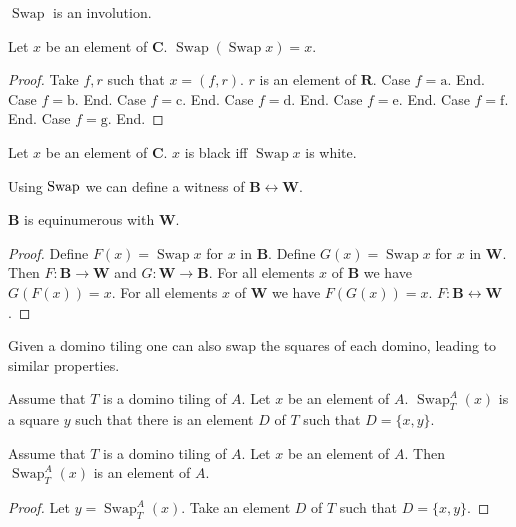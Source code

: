 \documentclass{article}
\newcommand{\Rank}{\mathbf{R}} %
\newcommand{\fileA}{\mathrm{a}}
\newcommand{\fileB}{\mathrm{b}}
\newcommand{\fileC}{\mathrm{c}}
\newcommand{\fileD}{\mathrm{d}}
\newcommand{\fileE}{\mathrm{e}}
\newcommand{\fileF}{\mathrm{f}}
\newcommand{\fileG}{\mathrm{g}}
\newcommand{\Checkerboard}{\mathbf{C}}
\newcommand{\Black}{\mathbf{B}}
\newcommand{\White}{\mathbf{W}}
\newcommand{\Swap}[1]{\operatorname{Swap}#1}
\newcommand{\Sw}[3]{\operatorname{Swap}_{#1}^{#2}(#3)}
\begin{document}
$\Swap{}$ is an involution.

\begin{forthel}
    \begin{lemma}
        Let $x$ be an element of $\Checkerboard$.
        $\Swap{(\Swap{x})} = x$.
    \end{lemma}
    \begin{proof}
        Take $f, r$ such that $x = (f,r)$. $r$ is an element of $\Rank$.
        Case $f = \fileA$. End.
        Case $f = \fileB$. End.
        Case $f = \fileC$. End.
        Case $f = \fileD$. End.
        Case $f = \fileE$. End.
        Case $f = \fileF$. End.
        Case $f = \fileG$. End.
    \end{proof}

    \begin{lemma}
        Let $x$ be an element of $\Checkerboard$.
        $x$ is black iff $\Swap{x}$ is white.
    \end{lemma}
\end{forthel}

Using $\Swap$ we can define a witness of $\Black \leftrightarrow \White$.

\begin{forthel}
    \begin{lemma}
        $\Black$ is equinumerous with $\White$.
    \end{lemma}
    \begin{proof}
        Define $F(x) = \Swap{x}$ for $x$ in $\Black$.
        Define $G(x) = \Swap{x}$ for $x$ in $\White$.
        Then $F : \Black \to \White$ and $G : \White \to \Black$.
        For all elements $x$ of $\Black$ we have $G(F(x)) = x$.
        For all elements $x$ of $\White$ we have $F(G(x)) = x$.
        $F : \Black \leftrightarrow \White$.
    \end{proof}
\end{forthel}

Given a domino tiling one can also swap the squares of each domino,
leading to similar properties.

\begin{forthel}
    \begin{signature}
        Assume that $T$ is a domino tiling of $A$.
        Let $x$ be an element of $A$.
        $\Sw{T}{A}{x}$ is a square $y$ such that there is an element $D$ of $T$
        such that $D = \{x,y\}$.
    \end{signature}

    \begin{lemma}
        Assume that $T$ is a domino tiling of $A$.
        Let $x$ be an element of $A$.
        Then $\Sw{T}{A}{x}$ is an element of $A$.
    \end{lemma}
    \begin{proof}
        Let $y = \Sw{T}{A}{x}$.
        Take an element $D$ of $T$ such that $D = \{x,y\}$.
    \end{proof}
\end{forthel}
\end{document}
